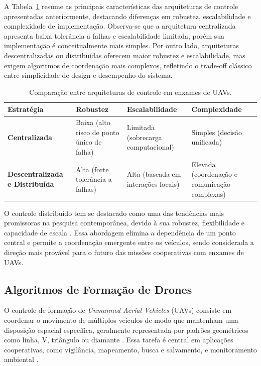 \documentclass[portuguese]{sbcreviews-2025}%
\begin{document}
A Tabela~\ref{tab:arquiteturas-uavs} resume as principais características das arquiteturas de controle apresentadas anteriormente, destacando diferenças em robustez, escalabilidade e complexidade de implementação. Observa-se que a arquitetura centralizada apresenta baixa tolerância a falhas e escalabilidade limitada, porém sua implementação é conceitualmente mais simples. Por outro lado, arquiteturas descentralizadas ou distribuídas oferecem maior robustez e escalabilidade, mas exigem algoritmos de coordenação mais complexos, refletindo o trade-off clássico entre simplicidade de design e desempenho do sistema.


\begin{table}[h!]
\centering
\caption{Comparação entre arquiteturas de controle em enxames de UAVs.}
\label{tab:arquiteturas-uavs}
\begin{tabular}{|p{3cm}|p{4cm}|p{3cm}|p{4cm}|}
\hline
\textbf{Estratégia} & \textbf{Robustez} & \textbf{Escalabilidade} & \textbf{Complexidade} \\ \hline
\textbf{Centralizada} & Baixa (alto risco de ponto único de falha) \cite{ouyang2023formation} & Limitada (sobrecarga computacional) \cite{bu2024advancement} & Simples (decisão unificada) \cite{bu2024advancement} \\ \hline
\textbf{Descentralizada e Distribuída} & Alta (forte tolerância a falhas) \cite{ouyang2023formation} & Alta (baseada em interações locais) \cite{bu2024advancement} & Elevada (coordenação e comunicação complexas) \cite{bu2024advancement} \\ \hline
\end{tabular}
\end{table}


O controle distribuído tem se destacado como uma das tendências mais promissoras na pesquisa contemporânea, devido à sua robustez, flexibilidade e capacidade de escala \cite{ouyang2023formation}. Essa abordagem elimina a dependência de um ponto central e permite a coordenação emergente entre os veículos, sendo considerada a direção mais provável para o futuro das missões cooperativas com enxames de UAVs.

\subsection{Algoritmos de Formação de Drones}

O controle de formação de \textit{Unmanned Aerial Vehicles} (UAVs) consiste em coordenar o movimento de múltiplos veículos de modo que mantenham uma disposição espacial específica, geralmente representada por padrões geométricos como linha, V, triângulo ou diamante \cite{bu2024advancement}. Essa tarefa é central em aplicações cooperativas, como vigilância, mapeamento, busca e salvamento, e monitoramento ambiental \cite{bu2024advancement, ouyang2023formation}.
\end{document}
